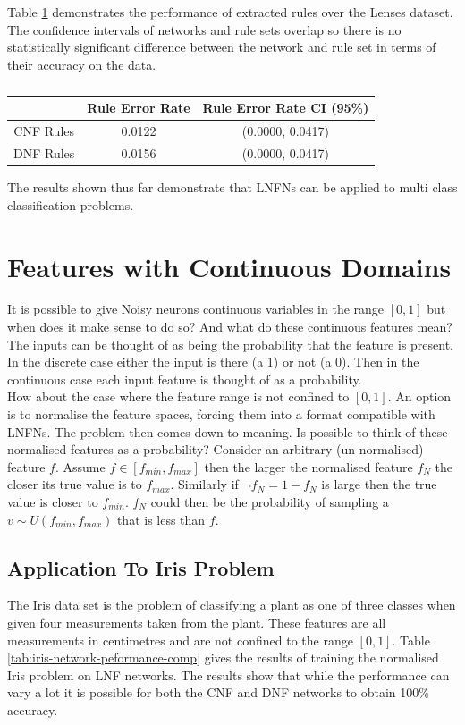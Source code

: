 Table \ref{tab:lenses-rule-peformance-comp} demonstrates the performance of extracted rules over the Lenses dataset. The confidence intervals of networks and rule sets overlap so there is no statistically significant difference between the network and rule set in terms of their accuracy on the data.

\begin{table}[H]
	\begin{center}
		\begin{tabular}{| c | c | c |}
			\hline
			& Rule Error Rate & Rule Error Rate CI (95\%) \\
			\hline
			\hline
			CNF Rules & 0.0122 & (0.0000, 0.0417) \\
			\hline
			DNF Rules & 0.0156 & (0.0000, 0.0417) \\
			\hline
		\end{tabular}
	\end{center}
	\caption{}
	\label{tab:lenses-rule-peformance-comp}
\end{table}

The results shown thus far demonstrate that LNFNs can be applied to multi class classification problems.

\section{Features with Continuous Domains}
It is possible to give Noisy neurons continuous variables in the range $[0,1]$ but when does it make sense to do so? And what do these continuous features mean? The inputs can be thought of as being the probability that the feature is present. In the discrete case either the input is there (a 1) or not (a 0). Then in the continuous case each input feature is thought of as a probability.\\

How about the case where the feature range is not confined to $[0,1]$. An option is to normalise the feature spaces, forcing them into a format compatible with LNFNs. The problem then comes down to meaning. Is possible to think of these normalised features as a probability? Consider an arbitrary (un-normalised) feature $f$. Assume $f \in [f_{min}, f_{max}]$ then the larger the normalised feature $f_N$ the closer its true value is to $f_{max}$. Similarly if $\lnot f_N = 1 - f_N$ is large then the true value is closer to $f_{min}$. $f_N$ could then be the probability of sampling a $v \sim U(f_{min}, f_{max})$ that is less than $f$.


\subsection{Application To Iris Problem}
The Iris data set \cite{Lichman:2013} is the problem of classifying a plant as one of three classes when given four measurements taken from the plant. These features are all measurements in centimetres and are not confined to the range $[0, 1]$. Table \ref{tab:iris-network-peformance-comp} gives the results of training the normalised Iris problem on LNF networks. The results show that while the performance can vary a lot it is possible for both the CNF and DNF networks to obtain 100\% accuracy.

